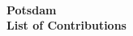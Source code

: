 \documentclass[%
  B5paper,
  pagesize,%
  1headlines,%
  8pt,%
  DIV=14,
  BCOR=12mm,
  twoside,
  smallheadings,
]{scrartcl}
\begin{document}
\sloppy

\thispagestyle{empty}
\begin{center}
\unilogo\\
\Huge\bfseries Potsdam\\ List of Contributions \\
\end{center}


\end{document}
